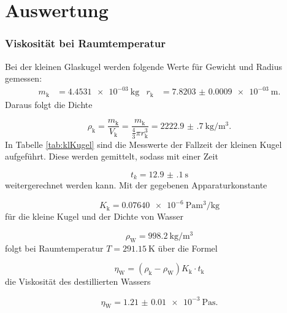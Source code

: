 \section{Auswertung}
\label{sec:Auswertung}

\subsubsection{Viskosität bei Raumtemperatur}

Bei der kleinen Glaskugel werden folgende Werte für Gewicht und Radius
gemessen:
\begin{align}
  m_\text{k} & = \SI{4.4531e-03}{\kilo\gram} & r_\text{k} & =
  \SI{7.8203(9)e-03}{\meter}.
\end{align}
Daraus folgt die Dichte

\begin{equation}
  \rho_\text{k} = \frac{m_\text{k}}{V_\text{k}} = \frac{m_\text{k}}
  {\frac{4}{3}\pi r_\text{k}^3} = \SI{2222.9(7)}{\kilo\gram\per\cubic\meter}.
\end{equation}
In Tabelle \ref{tab:klKugel} sind die Messwerte der Fallzeit der kleinen
Kugel aufgeführt. Diese werden gemittelt, sodass mit einer Zeit

\begin{equation}
  t_{k} = \SI{12.9(1)}{\second}
\end{equation}
weitergerechnet werden kann.
Mit der gegebenen Apparaturkonstante

\begin{equation}
  K_\text{k} = \SI{0.07640e-6}{\pascal\cubic\meter\per\kilo\gram}
\end{equation}
für die kleine Kugel und der Dichte von Wasser \cite{Wasserdichte}

\begin{equation}
  \rho_\text{W} = \SI{998.2}{\kilo\gram\per\cubic\meter}
\end{equation}
folgt bei Raumtemperatur $T=\SI{291.15}{\kelvin}$ über die Formel

\begin{equation}
  \eta_\text{W} = (\rho_\text{k}-\rho_\text{W})K_\text{k} \cdot t_\text{k}
  \label{eqn:Viskositaet}
\end{equation}
die Viskosität des destillierten Wassers

\begin{equation}
  \eta_\text{W} = \SI{1.21(1)e-3}{\pascal\second}.
  \label{eqn:Viskosi}
\end{equation}

